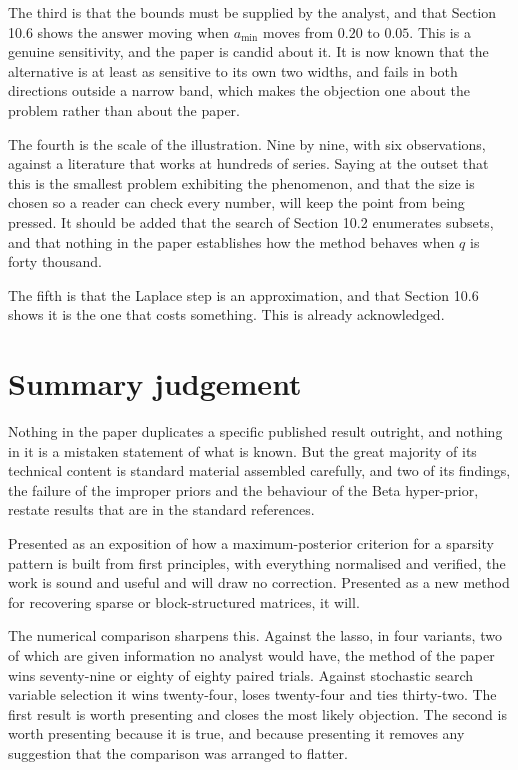 The third is that the bounds must be supplied by the analyst, and that Section 10.6
shows the answer moving when $a_{\min}$ moves from $0.20$ to $0.05$. This is a
genuine sensitivity, and the paper is candid about it. It is now known that the
alternative is at least as sensitive to its own two widths, and fails in both
directions outside a narrow band, which makes the objection one about the problem
rather than about the paper.

The fourth is the scale of the illustration. Nine by nine, with six observations,
against a literature that works at hundreds of series. Saying at the outset that
this is the smallest problem exhibiting the phenomenon, and that the size is chosen
so a reader can check every number, will keep the point from being pressed. It
should be added that the search of Section 10.2 enumerates subsets, and that nothing
in the paper establishes how the method behaves when $q$ is forty thousand.

The fifth is that the Laplace step is an approximation, and that Section 10.6 shows
it is the one that costs something. This is already acknowledged.

\section{Summary judgement}

Nothing in the paper duplicates a specific published result outright, and nothing
in it is a mistaken statement of what is known. But the great majority of its
technical content is standard material assembled carefully, and two of its
findings, the failure of the improper priors and the behaviour of the Beta
hyper-prior, restate results that are in the standard references.

Presented as an exposition of how a maximum-posterior criterion for a sparsity
pattern is built from first principles, with everything normalised and verified,
the work is sound and useful and will draw no correction. Presented as a new method
for recovering sparse or block-structured matrices, it will.

The numerical comparison sharpens this. Against the lasso, in four variants, two of
which are given information no analyst would have, the method of the paper wins
seventy-nine or eighty of eighty paired trials. Against stochastic search variable
selection it wins twenty-four, loses twenty-four and ties thirty-two. The first
result is worth presenting and closes the most likely objection. The second is worth
presenting because it is true, and because presenting it removes any suggestion that
the comparison was arranged to flatter.

